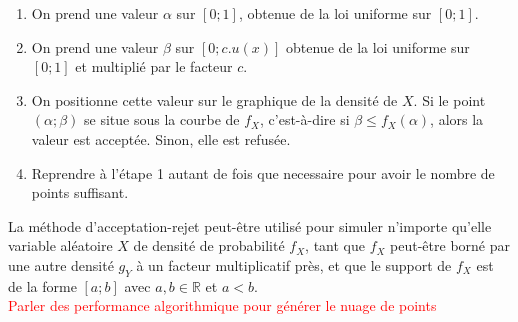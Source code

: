 \documentclass{article}
\begin{document}
\begin{enumerate}
\item On prend une valeur $\alpha$ sur $[0;1]$, obtenue de la loi uniforme sur $[0;1]$.
\item On prend une valeur $\beta$ sur $[0;c.u(x)]$ obtenue de la loi uniforme sur $[0;1]$ et multiplié par le facteur $c$.
\item On positionne cette valeur sur le graphique de la densité de $X$. Si le point $(\alpha; \beta)$ se situe sous la courbe de $f_X$, c'est-à-dire si $\beta \leq f_X(\alpha)$, alors la valeur est acceptée. Sinon, elle est refusée.
\item Reprendre à l'étape 1 autant de fois que necessaire pour avoir le nombre de points suffisant.
\end{enumerate}
\begin{center}
\end{center}
La méthode d'acceptation-rejet peut-être utilisé pour simuler n'importe qu'elle variable aléatoire $X$ de densité de probabilité $f_X$, tant que $f_X$ peut-être borné par une autre densité $g_Y$ à un facteur multiplicatif près, et que le support de $f_X$ est de la forme $[a;b]$ avec $a,b \in \mathbb{R}$ et $a < b$.\\
\textcolor{red}{Parler des performance algorithmique pour générer le nuage de points}
\end{document}
